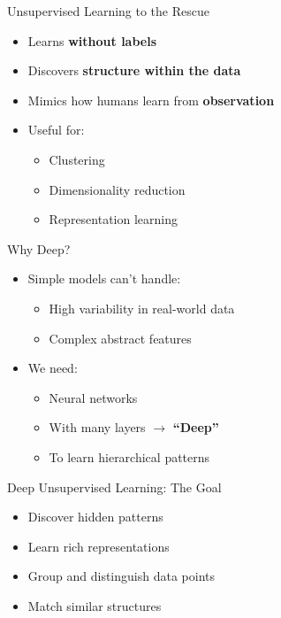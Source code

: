 \begin{frame}{Unsupervised Learning to the Rescue}
    \begin{itemize}
        \item Learns \textbf{without labels}
        \item Discovers \textbf{structure within the data}
        \item Mimics how humans learn from \textbf{observation}
        \item Useful for:
        \begin{itemize}
            \item Clustering
            \item Dimensionality reduction
            \item Representation learning
        \end{itemize}
    \end{itemize}
\end{frame}

\begin{frame}{Why Deep?}
    \begin{itemize}
        \item Simple models can’t handle:
        \begin{itemize}
            \item High variability in real-world data
            \item Complex abstract features
        \end{itemize}
        \item We need:
        \begin{itemize}
            \item Neural networks
            \item With many layers $\rightarrow$ \textbf{``Deep''}
            \item To learn hierarchical patterns
        \end{itemize}
    \end{itemize}
\end{frame}


\begin{frame}{Deep Unsupervised Learning: The Goal}
    \begin{itemize}
        \item Discover hidden patterns
        \item Learn rich representations
        \item Group and distinguish data points
        \item Match similar structures
    \end{itemize}
\end{frame}